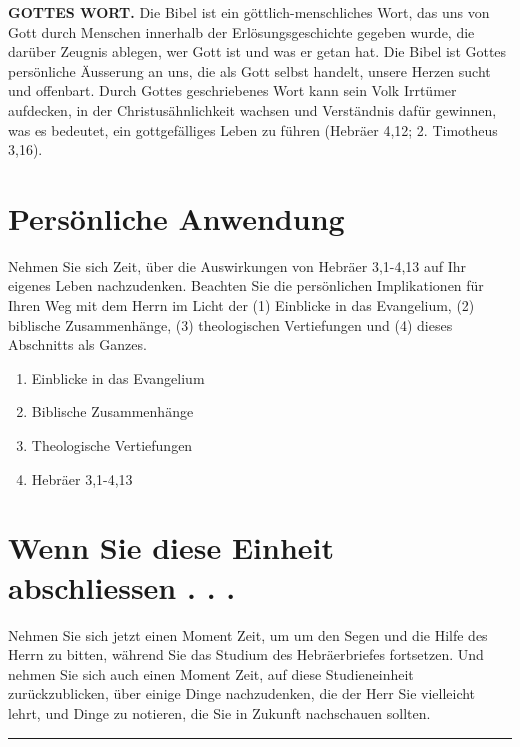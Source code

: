 \documentclass[
  12pt,
]{krantz}
\providecommand{\tightlist}{%
  \setlength{\itemsep}{0pt}\setlength{\parskip}{0pt}}
\begin{document}
\textbf{GOTTES WORT.} Die Bibel ist ein göttlich-menschliches Wort, das uns von Gott durch Menschen innerhalb der Erlösungsgeschichte gegeben wurde, die darüber Zeugnis ablegen, wer Gott ist und was er getan hat. Die Bibel ist Gottes persönliche Äusserung an uns, die als Gott selbst handelt, unsere Herzen sucht und offenbart. Durch Gottes geschriebenes Wort kann sein Volk Irrtümer aufdecken, in der Christusähnlichkeit wachsen und Verständnis dafür gewinnen, was es bedeutet, ein gottgefälliges Leben zu führen (Hebräer 4,12; 2. Timotheus 3,16).

\hypertarget{persuxf6nliche-anwendung}{%
\section{Persönliche Anwendung}\label{persuxf6nliche-anwendung}}

Nehmen Sie sich Zeit, über die Auswirkungen von Hebräer 3,1-4,13 auf Ihr eigenes Leben nachzudenken. Beachten Sie die persönlichen Implikationen für Ihren Weg mit dem Herrn im Licht der (1) Einblicke in das Evangelium, (2) biblische Zusammenhänge, (3) theologischen Vertiefungen und (4) dieses Abschnitts als Ganzes.

\begin{enumerate}
\def\labelenumi{\arabic{enumi}.}
\tightlist
\item
  Einblicke in das Evangelium
\item
  Biblische Zusammenhänge
\item
  Theologische Vertiefungen
\item
  Hebräer 3,1-4,13
\end{enumerate}

\hypertarget{wenn-sie-diese-einheit-abschliessen-.-.-.}{%
\section{Wenn Sie diese Einheit abschliessen . . .}\label{wenn-sie-diese-einheit-abschliessen-.-.-.}}

Nehmen Sie sich jetzt einen Moment Zeit, um um den Segen und die Hilfe des Herrn zu bitten, während Sie das Studium des Hebräerbriefes fortsetzen. Und nehmen Sie sich auch einen Moment Zeit, auf diese Studieneinheit zurückzublicken, über einige Dinge nachzudenken, die der Herr Sie vielleicht lehrt, und Dinge zu notieren, die Sie in Zukunft nachschauen sollten.

\begin{center}\rule{0.5\linewidth}{0.5pt}\end{center}
\end{document}
